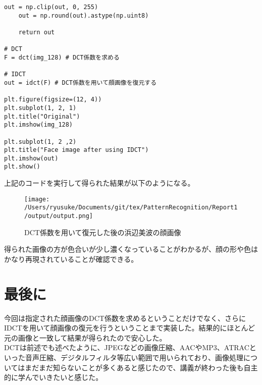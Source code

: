 \documentclass[dvipdfmx,uplatex]{jsarticle}
\begin{document}
\begin{spacing}{1.4}
\begin{lstlisting}[caption=DCT係数を元に画像を復元するソースコード]
    out = np.clip(out, 0, 255)
    out = np.round(out).astype(np.uint8)

    return out

# DCT
F = dct(img_128) # DCT係数を求める

# IDCT
out = idct(F) # DCT係数を用いて顔画像を復元する

plt.figure(figsize=(12, 4))
plt.subplot(1, 2, 1)
plt.title("Original")
plt.imshow(img_128)

plt.subplot(1, 2 ,2)
plt.title("Face image after using IDCT")
plt.imshow(out)
plt.show()
\end{lstlisting}

上記のコードを実行して得られた結果が以下のようになる。\\
\begin{figure}[htbp]
\begin{center}
\texttt{[image: /Users/ryusuke/Documents/git/tex/PatternRecognition/Report1/output/output.png]}
\caption{DCT係数を用いて復元した後の浜辺美波の顔画像}
\end{center}
\end{figure}

得られた画像の方が色合いが少し濃くなっていることがわかるが、顔の形や色はかなり再現されていることが確認できる。
\newpage

\section{最後に}
今回は指定された顔画像のDCT係数を求めるということだけでなく、さらにIDCTを用いて顔画像の復元を行うということまで実装した。結果的にほとんど元の画像と一致して結果が得られたので安心した。\\
DCTは前述でも述べたように、JPEGなどの画像圧縮、AACやMP3、ATRACといった音声圧縮、デジタルフィルタ等広い範囲で用いられており、画像処理についてはまだまだ知らないことが多くあると感じたので、講義が終わった後も自主的に学んでいきたいと感じた。

\end{spacing}
\end{document}
